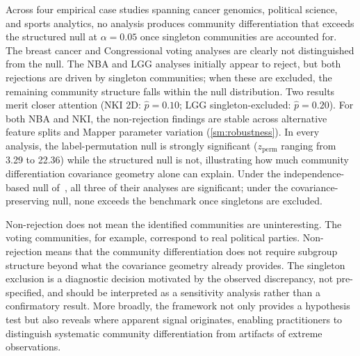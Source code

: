 \documentclass[hidelinks]{siamart251216}
\begin{document}
Across four empirical case studies spanning cancer genomics, political
science, and sports analytics, no analysis produces community
differentiation that exceeds the structured null at $\alpha = 0.05$
once singleton communities are accounted for.
The breast cancer and Congressional voting analyses are clearly not
distinguished from the null.  The NBA and LGG analyses initially appear
to reject, but both rejections are driven by singleton communities;
when these are excluded, the remaining community structure falls within
the null distribution.  Two results merit closer attention
(NKI 2D: $\hat{p} = 0.10$; LGG singleton-excluded:
$\hat{p} = 0.20$).  For both NBA and NKI, the non-rejection findings
are stable across alternative feature splits and Mapper parameter variation
(\cref{sm:robustness}).  In every analysis, the label-permutation null
is strongly significant ($z_{\mathrm{perm}}$ ranging from 3.29 to
22.36) while the structured null is not, illustrating how much community
differentiation covariance geometry alone can explain.  Under the independence-based null of~\cite{Lum2013}, all three of
their analyses are significant; under the covariance-preserving null,
none exceeds the benchmark once singletons are excluded.

Non-rejection does not mean the identified communities are
uninteresting.  The voting communities, for example, correspond to real
political parties.  Non-rejection means that the community
differentiation does not require subgroup structure beyond what the
covariance geometry already provides.  The singleton exclusion is a
diagnostic decision motivated by the observed discrepancy, not
pre-specified, and should be interpreted as a sensitivity analysis
rather than a confirmatory result.  More broadly, the framework not only
provides a hypothesis test but also reveals where apparent signal
originates, enabling practitioners to distinguish systematic community
differentiation from artifacts of extreme observations.
\end{document}
